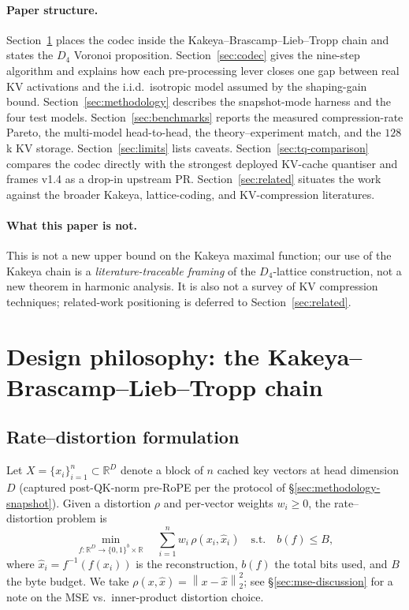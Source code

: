 \documentclass[11pt,a4paper]{article}
\theoremstyle{definition}
\theoremstyle{plain}
\newcommand{\R}{\mathbb{R}}
\newcommand{\norm}[1]{\left\lVert#1\right\rVert}
\begin{document}
\paragraph{Paper structure.}
Section~\ref{sec:framework} places the codec inside the
Kakeya--Brascamp--Lieb--Tropp chain and states the $D_4$ Voronoi
proposition. Section~\ref{sec:codec} gives the nine-step algorithm
and explains how each pre-processing lever closes one gap between
real KV activations and the i.i.d.\ isotropic model assumed by the
shaping-gain bound. Section~\ref{sec:methodology} describes the
snapshot-mode harness and the four test models.
Section~\ref{sec:benchmarks} reports the measured
compression-rate Pareto, the multi-model head-to-head, the
theory--experiment match, and the $128$k KV storage.
Section~\ref{sec:limits} lists caveats.
Section~\ref{sec:tq-comparison} compares the codec directly with
the strongest deployed KV-cache quantiser and frames v1.4 as a
drop-in upstream PR.  Section~\ref{sec:related} situates the work
against the broader Kakeya, lattice-coding, and KV-compression
literatures.

\paragraph{What this paper is not.}
This is not a new upper bound on the Kakeya maximal function; our
use of the Kakeya chain is a \emph{literature-traceable framing} of
the $D_4$-lattice construction, not a new theorem in harmonic
analysis.  It is also not a survey of KV compression techniques;
related-work positioning is deferred to Section~\ref{sec:related}.

\section{Design philosophy: the Kakeya--Brascamp--Lieb--Tropp chain}
\label{sec:framework}

\subsection{Rate--distortion formulation}

Let $X = \{x_i\}_{i=1}^n \subset \R^D$ denote a block of $n$ cached
key vectors at head dimension $D$ (captured post-QK-norm pre-RoPE
per the protocol of \S\ref{sec:methodology-snapshot}). Given a
distortion $\rho$ and per-vector weights $w_i \geq 0$, the
rate--distortion problem is
\begin{equation}
\label{eq:rd}
\min_{f: \R^D \to \{0,1\}^b \times \R} \quad \sum_{i=1}^n w_i \, \rho(x_i, \hat{x}_i)
\quad \text{s.t.} \quad b(f) \leq B,
\end{equation}
where $\hat{x}_i = f^{-1}(f(x_i))$ is the reconstruction, $b(f)$ the
total bits used, and $B$ the byte budget. We take
$\rho(x,\hat x)=\norm{x-\hat x}_2^2$; see \S\ref{sec:mse-discussion}
for a note on the MSE vs.\ inner-product distortion choice.
\end{document}
